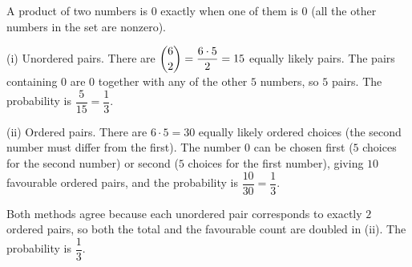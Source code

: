 A product of two numbers is $0$ exactly when one of them is $0$ (all the other numbers in the set are nonzero).

(i) Unordered pairs. There are $\dbinom62=\dfrac{6\cdot5}{2}=15$ equally likely pairs. The pairs containing $0$ are $0$ together with any of the other $5$ numbers, so $5$ pairs. The probability is $\dfrac{5}{15}=\dfrac{1}{3}$.

(ii) Ordered pairs. There are $6\cdot5=30$ equally likely ordered choices (the second number must differ from the first). The number $0$ can be chosen first ($5$ choices for the second number) or second ($5$ choices for the first number), giving $10$ favourable ordered pairs, and the probability is $\dfrac{10}{30}=\dfrac{1}{3}$.

Both methods agree because each unordered pair corresponds to exactly $2$ ordered pairs, so both the total and the favourable count are doubled in (ii). The probability is $\boxed{\dfrac{1}{3}}$.
